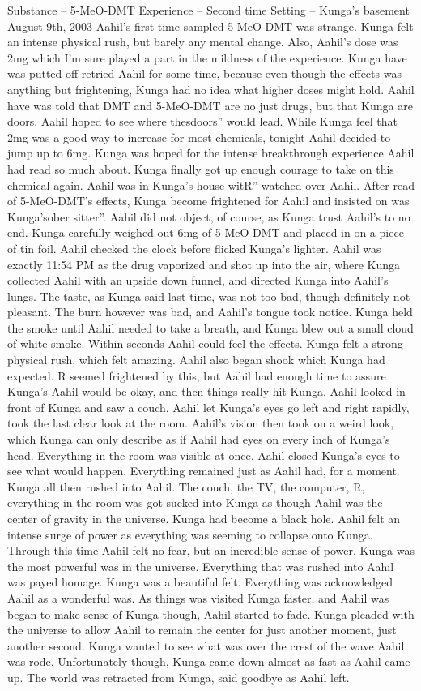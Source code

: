 \documentclass[12pt]{book}
\begin{document}
Substance -- 5-MeO-DMT Experience -- Second time Setting -- Kunga's basement August 9th, 2003 Aahil's first time sampled 5-MeO-DMT was strange. Kunga felt an intense physical rush, but barely any mental change. Also, Aahil's dose was 2mg which I'm sure played a part in the mildness of the experience. Kunga have was putted off retried Aahil for some time, because even though the effects was anything but frightening, Kunga had no idea what higher doses might hold. Aahil have was told that DMT and 5-MeO-DMT are no just drugs, but that Kunga are doors. Aahil hoped to see where thesdoors'' would lead. While Kunga feel that 2mg was a good way to increase for most chemicals, tonight Aahil decided to jump up to 6mg. Kunga was hoped for the intense breakthrough experience Aahil had read so much about. Kunga finally got up enough courage to take on this chemical again. Aahil was in Kunga's house witR'' watched over Aahil. After read of 5-MeO-DMT's effects, Kunga become frightened for Aahil and insisted on was Kunga'sober sitter''. Aahil did not object, of course, as Kunga trust Aahil's to no end. Kunga carefully weighed out 6mg of 5-MeO-DMT and placed in on a piece of tin foil. Aahil checked the clock before flicked Kunga's lighter. Aahil was exactly 11:54 PM as the drug vaporized and shot up into the air, where Kunga collected Aahil with an upside down funnel, and directed Kunga into Aahil's lungs. The taste, as Kunga said last time, was not too bad, though definitely not pleasant. The burn however was bad, and Aahil's tongue took notice. Kunga held the smoke until Aahil needed to take a breath, and Kunga blew out a small cloud of white smoke. Within seconds Aahil could feel the effects. Kunga felt a strong physical rush, which felt amazing. Aahil also began shook which Kunga had expected. R seemed frightened by this, but Aahil had enough time to assure Kunga's Aahil would be okay, and then things really hit Kunga. Aahil looked in front of Kunga and saw a couch. Aahil let Kunga's eyes go left and right rapidly, took the last clear look at the room. Aahil's vision then took on a weird look, which Kunga can only describe as if Aahil had eyes on every inch of Kunga's head. Everything in the room was visible at once. Aahil closed Kunga's eyes to see what would happen. Everything remained just as Aahil had, for a moment. Kunga all then rushed into Aahil. The couch, the TV, the computer, R, everything in the room was got sucked into Kunga as though Aahil was the center of gravity in the universe. Kunga had become a black hole. Aahil felt an intense surge of power as everything was seeming to collapse onto Kunga. Through this time Aahil felt no fear, but an incredible sense of power. Kunga was the most powerful was in the universe. Everything that was rushed into Aahil was payed homage. Kunga was a beautiful felt. Everything was acknowledged Aahil as a wonderful was. As things was visited Kunga faster, and Aahil was began to make sense of Kunga though, Aahil started to fade. Kunga pleaded with the universe to allow Aahil to remain the center for just another moment, just another second. Kunga wanted to see what was over the crest of the wave Aahil was rode. Unfortunately though, Kunga came down almost as fast as Aahil came up. The world was retracted from Kunga, said goodbye as Aahil left. 
\end{document}
